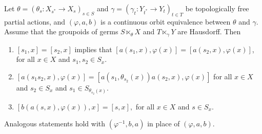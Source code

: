 \begin{lemma}\label{lem:seila}
Let $\theta=\left(\theta_s:X_{s^*}\to X_s\right)_{s\in S}$ and  $\gamma=\left(\gamma_t:Y_{t^*}\to Y_t\right)_{t\in T}$ be topologically free partial actions, and $(\varphi,a,b)$ is a continuous orbit equivalence between $\theta$ and $\gamma$. Assume that the groupoids of germs $S\ltimes_\theta X$ and $T\ltimes_\gamma Y$ are Hausdorff. Then
\begin{enumerate}%
\item[(a)] $[s_1, x]=[s_2, x]$ implies that $[a(s_1,x),\varphi(x)]=[a(s_2,x),\varphi(x)]$, for all $x\in X$ and $s_1, s_2 \in S_x$.

\item[(b)] $[a(s_1s_2, x),\varphi(x)]=[a(s_1, \theta_{s_2}(x))a(s_2, x),\varphi(x)]$ for all $x\in X$ and $s_2\in S_x$ and $s_1\in S_{\theta_{s_2}(x)}$.

\item[(c)] $[b(a(s, x), \varphi(x)),x] = [s,x],$ for all $x\in X$ and $s\in S_x$.
\end{enumerate}
Analogous statements hold with $(\varphi^{-1},b,a)$ in place of $(\varphi,a,b)$.
\end{lemma}

